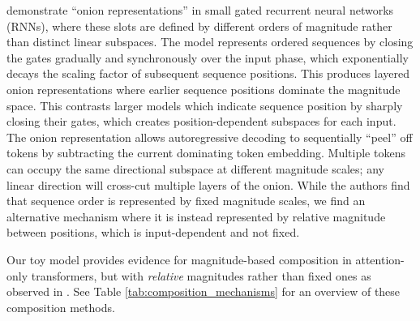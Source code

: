 \citet{csordas-etal-2024-recurrent} demonstrate ``onion representations'' in small gated recurrent neural networks (RNNs), where these slots are defined by different orders of magnitude rather than distinct linear subspaces.
The model represents ordered sequences by closing the gates gradually and synchronously over the input phase, which exponentially decays the scaling factor of subsequent sequence positions.
This produces layered onion representations where earlier sequence positions dominate the magnitude space.
This contrasts larger models which indicate sequence position by sharply closing their gates, which creates position-dependent subspaces for each input.
The onion representation allows autoregressive decoding to sequentially ``peel'' off tokens by subtracting the current dominating token embedding.
Multiple tokens can occupy the same directional subspace at different magnitude scales; any linear direction will cross-cut multiple layers of the onion. 
While the authors find that sequence order is represented by fixed magnitude scales, we find an alternative mechanism where it is instead represented by relative magnitude between positions, which is input-dependent and not fixed.

Our toy model provides evidence for magnitude-based composition in attention-only transformers, but with \textit{relative} magnitudes rather than fixed ones as observed in \citet{csordas-etal-2024-recurrent}. 
See Table \ref{tab:composition_mechanisms} for an overview of these composition methods.

